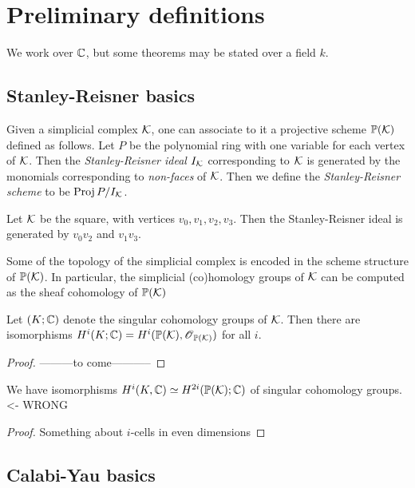 
\chapter{Preliminary definitions}

We work over $\mathbb{C}$, but some theorems may be stated over a field $k$.

\section{Stanley-Reisner basics} 

Given a simplicial complex $\mathcal K$, one can associate to it a projective scheme $\mathbb{P}(\mathcal K)$ defined as follows. Let $P$ be the polynomial ring with one variable for each vertex of $\mathcal K$. Then the \emph{Stanley-Reisner ideal $I_\mathcal K$} corresponding to $\mathcal K$ is generated by the monomials corresponding to \emph{non-faces} of $\mathcal K$. Then we define the \emph{Stanley-Reisner scheme} to be $\operatorname{Proj} P/I_\mathcal K$. 

\begin{example}
Let $\mathcal K$ be the square, with vertices $v_0,v_1,v_2,v_3$. Then the Stanley-Reisner ideal is generated by $v_0v_2$ and $v_1v_3$.
\end{example}

Some of the topology of the simplicial complex is encoded in the scheme structure of $\mathbb{P}(\mathcal K)$. In particular, the simplicial (co)homology groups of $\mathcal K$ can be computed as the sheaf cohomology of $\mathbb{P}(\mathcal K)$

\begin{lemma}
Let $(K;\mathbb{C})$ denote the singular cohomology groups of $\mathcal K$. Then there are isomorphisms $H^i(K;\mathbb{C})=H^i(\mathbb{P}(\mathcal K),\operatorname{\mathscr{O}}_{\mathbb{P}(\mathcal K)})$ for all $i$.
\end{lemma}
\begin{proof}
---------to come-----------
\end{proof}

\begin{corr}
We have isomorphisms $H^i(K,\mathbb{C}) \simeq H^{2i}(\mathbb{P}(\mathcal K);\mathbb{C})$ of singular cohomology groups. <- WRONG 
\end{corr}
\begin{proof}
Something about $i$-cells in even dimensions
\end{proof}

\section{Calabi-Yau basics}

